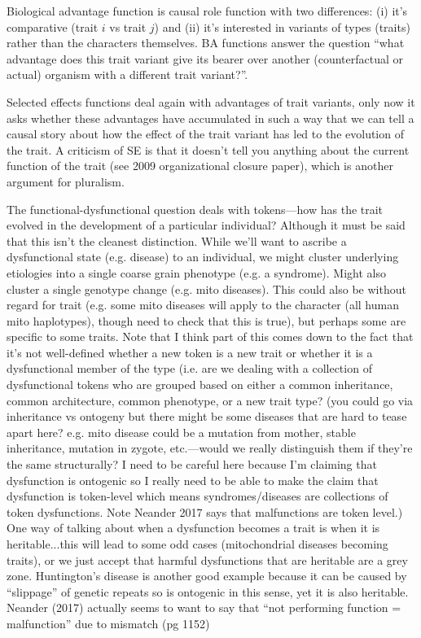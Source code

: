 \documentclass{article}
\begin{document}
Biological advantage function is causal role function with two differences: (i) it's comparative (trait $i$ vs trait $j$) and (ii) it's interested in variants of types (traits) rather than the characters themselves. BA functions answer the question ``what advantage does this trait variant give its bearer over another (counterfactual or actual) organism with a different trait variant?''.

Selected effects functions deal again with advantages of trait variants, only now it asks whether these advantages have accumulated in such a way that we can tell a causal story about how the effect of the trait variant has led to the evolution of the trait. A criticism of SE is that it doesn't tell you anything about the current function of the trait (see 2009 organizational closure paper), which is another argument for pluralism.

The functional-dysfunctional question deals with tokens---how has the trait evolved in the development of a particular individual? Although it must be said that this isn't the cleanest distinction. While we'll want to ascribe a dysfunctional state (e.g. disease) to an individual, we might cluster underlying etiologies into a single coarse grain phenotype (e.g. a syndrome). Might also cluster a single genotype change (e.g. mito diseases). This could also be without regard for trait (e.g. some mito diseases will apply to the character (all human mito haplotypes), though need to check that this is true), but perhaps some are specific to some traits.
Note that I think part of this comes down to the fact that it's not well-defined whether a new token is a new trait or whether it is a dysfunctional member of the type (i.e. are we dealing with a collection of dysfunctional tokens who are grouped based on either a common inheritance, common architecture, common phenotype, or a new trait type? (you could go via inheritance vs ontogeny but there might be some diseases that are hard to tease apart here? e.g. mito disease could be a mutation from mother, stable inheritance, mutation in zygote, etc.---would we really distinguish them if they're the same structurally? I need to be careful here because I'm claiming that dysfunction is ontogenic so I really need to be able to make the claim that dysfunction is token-level which means syndromes/diseases are collections of token dysfunctions. Note Neander 2017 says that malfunctions are token level.)
One way of talking about when a dysfunction becomes a trait is when it is heritable...this will lead to some odd cases (mitochondrial diseases becoming traits), or we just accept that harmful dysfunctions that are heritable are a grey zone. Huntington's disease is another good example because it can be caused by ``slippage'' of genetic repeats so is ontogenic in this sense, yet it is also heritable.
Neander (2017) actually seems to want to say that ``not performing function = malfunction'' due to mismatch (pg 1152)
\end{document}
